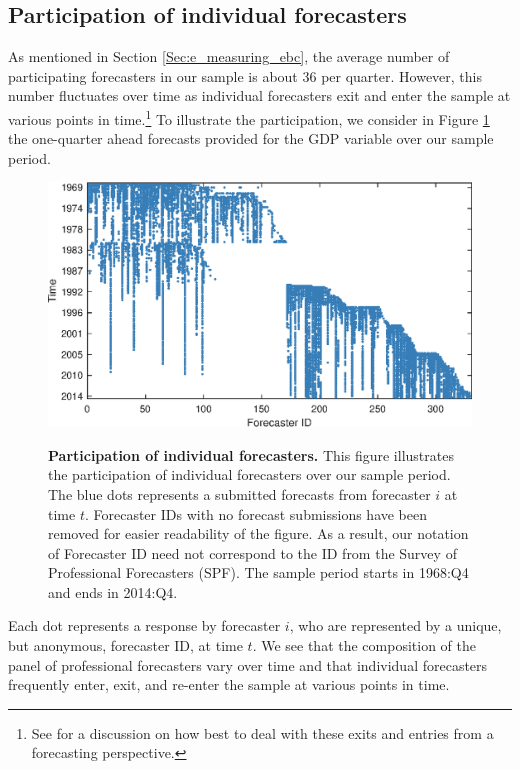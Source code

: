 \documentclass[12pt,letterpaper,leqno,doublespacing]{article}
\begin{document}
\begin{appendices}

\clearpage
\section{Participation of individual forecasters}\label{sec:e_participation_of_individual_forecasters}
As mentioned in Section \ref{Sec:e_measuring_ebc}, the average number of participating forecasters in our sample is about $36$ per quarter. However, this number fluctuates over time as individual forecasters exit and enter the sample at various points in time.\footnote{See \cite{CapistranTimmermann2009} for a discussion on how best to deal with these exits and entries from a forecasting perspective.} To illustrate the participation, we consider in Figure \ref{Fig:e_participating_forecasters} the one-quarter ahead forecasts provided for the GDP variable over our sample period. 
\begin{figure}[htbp]
    \caption{
        \textbf{Participation of individual forecasters.} \newline
        This figure illustrates the participation of individual forecasters over our sample period. The blue dots represents a submitted forecasts from forecaster $i$ at time $t$. Forecaster IDs with no forecast submissions have been removed for easier readability of the figure. As a result, our notation of Forecaster ID need not correspond to the ID from the Survey of Professional Forecasters (SPF). The sample period starts in 1968:Q4 and ends in 2014:Q4.
    }
    \centering
    \includegraphics[scale=0.8]{figures/e_participating_forecasters.eps}
    \label{Fig:e_participating_forecasters}
\end{figure}
Each dot represents a response by forecaster $i$, who are represented by a unique, but anonymous, forecaster ID, at time $t$. We see that the composition of the panel of professional forecasters vary over time and that individual forecasters frequently enter, exit, and re-enter the sample at various points in time. 

\end{appendices}
\end{document}
